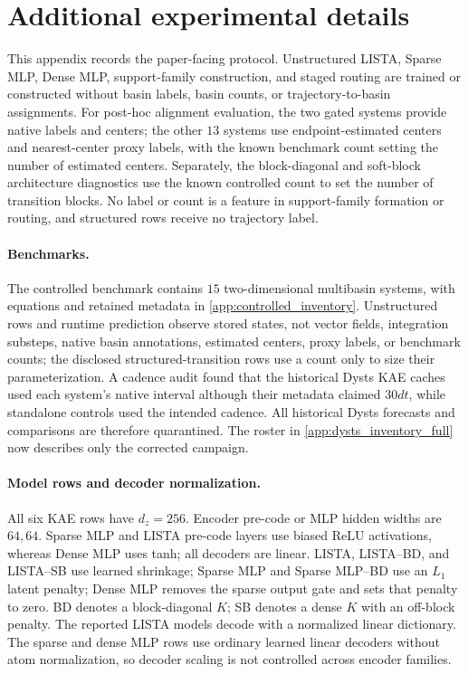 \section{Additional experimental details}
\label{app:experimental_details}

This appendix records the paper-facing protocol. Unstructured LISTA, Sparse MLP, Dense MLP, support-family construction, and staged routing are trained or constructed without basin labels, basin counts, or trajectory-to-basin assignments. For post-hoc alignment evaluation, the two gated systems provide native labels and centers; the other \(13\) systems use endpoint-estimated centers and nearest-center proxy labels, with the known benchmark count setting the number of estimated centers. Separately, the block-diagonal and soft-block architecture diagnostics use the known controlled count to set the number of transition blocks. No label or count is a feature in support-family formation or routing, and structured rows receive no trajectory label.

\paragraph{Benchmarks.}
The controlled benchmark contains \(15\) two-dimensional multibasin systems, with equations and retained metadata in \cref{app:controlled_inventory}. Unstructured rows and runtime prediction observe stored states, not vector fields, integration substeps, native basin annotations, estimated centers, proxy labels, or benchmark counts; the disclosed structured-transition rows use a count only to size their parameterization. A cadence audit found that the historical Dysts KAE caches used each system's native interval although their metadata claimed \(30dt\), while standalone controls used the intended cadence. All historical Dysts forecasts and comparisons are therefore quarantined. The roster in \cref{app:dysts_inventory_full} now describes only the corrected campaign.

\paragraph{Model rows and decoder normalization.}
All six KAE rows have \(d_z=256\). Encoder pre-code or MLP hidden widths are \(64,64\). Sparse MLP and LISTA pre-code layers use biased ReLU activations, whereas Dense MLP uses tanh; all decoders are linear. LISTA, LISTA--BD, and LISTA--SB use learned shrinkage; Sparse MLP and Sparse MLP--BD use an \(L_1\) latent penalty; Dense MLP removes the sparse output gate and sets that penalty to zero. BD denotes a block-diagonal \(K\); SB denotes a dense \(K\) with an off-block penalty. The reported LISTA models decode with a normalized linear dictionary. The sparse and dense MLP rows use ordinary learned linear decoders without atom normalization, so decoder scaling is not controlled across encoder families.

